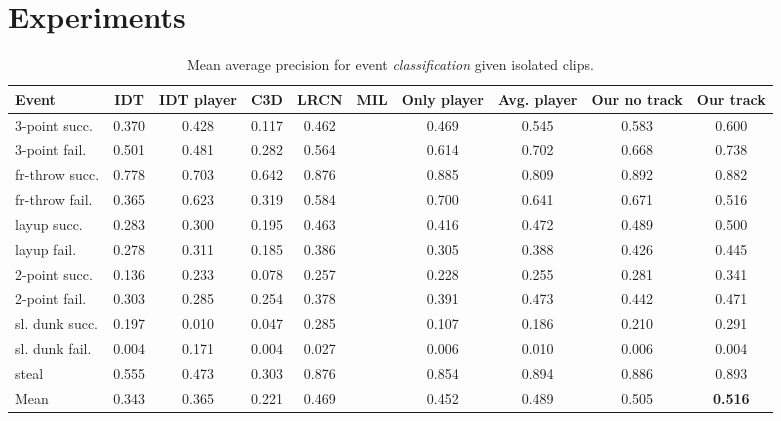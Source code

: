 
\section{Experiments}
\label{sec:experiments}

\begin{table}[ht!]
\begin{center}
\small
 \begin{tabular}{|l|c|c|c|c|c|c|c|c|c|}
  \hline
Event & IDT\cite{Wang_CVPR11} & IDT\cite{Wang_CVPR11} player & C3D \cite{Tran_arxiv14} & LRCN \cite{Donahue_arxiv14} & MIL\cite{} & Only player & Avg. player & Our no track & Our track \\ \hline \hline

3-point succ.    & 0.370 & 0.428 & 0.117 & 0.462 &  & 0.469 & 0.545 & 0.583 & 0.600 \\
3-point fail.    & 0.501 &  0.481& 0.282 & 0.564 &  & 0.614 & 0.702 & 0.668 & 0.738 \\
fr-throw succ. & 0.778 &  0.703& 0.642 & 0.876 &  & 0.885 & 0.809 & 0.892 & 0.882 \\
fr-throw fail. & 0.365 &  0.623& 0.319 & 0.584 &  & 0.700 & 0.641 & 0.671 & 0.516 \\
layup succ.      & 0.283 & 0.300 & 0.195 & 0.463 &  & 0.416 & 0.472 & 0.489 & 0.500 \\
layup fail.      & 0.278 &0.311  & 0.185 & 0.386 &  & 0.305 & 0.388 & 0.426 & 0.445 \\
2-point succ.    & 0.136 &  0.233 & 0.078 & 0.257 &  & 0.228 & 0.255 & 0.281 & 0.341 \\
2-point fail.    & 0.303 &  0.285 & 0.254 & 0.378 &  & 0.391 & 0.473 & 0.442 & 0.471 \\
sl. dunk succ.  & 0.197 &  0.010 & 0.047 & 0.285 &  & 0.107 & 0.186 & 0.210 & 0.291 \\
sl. dunk fail.  & 0.004 &  0.171& 0.004 & 0.027 &  & 0.006 & 0.010 & 0.006 & 0.004 \\
steal            & 0.555 &  0.473& 0.303 & 0.876 &  & 0.854 & 0.894 & 0.886 & 0.893 \\ \hline \hline
Mean             & 0.343 &  0.365 & 0.221 & 0.469 &  & 0.452 & 0.489 & 0.505 & \textbf{0.516} \\ \hline
  \end{tabular}
\end{center}
  \caption{Mean average precision for event {\em classification} given
    isolated clips.}
  \label{tab:event_class}
  \label{tab:class_res}
\end{table}


